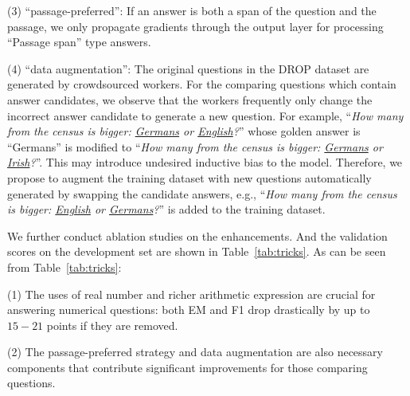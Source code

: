 \documentclass[11pt,a4paper]{article}
\begin{document}
(3) ``passage-preferred'': If an answer is both a span of the question and the passage, we only propagate gradients through the output layer for processing ``Passage span'' type answers.

(4) ``data augmentation'': The original questions in the DROP dataset are generated by crowdsourced workers. For the comparing questions which contain answer candidates, we observe that the workers frequently only change the incorrect answer candidate to generate a new question. For example, ``\emph{How many from the census is bigger: \underline{Germans} or \underline{English}?}'' whose golden answer is ``Germans'' is modified to ``\emph{How many from the census is bigger: \underline{Germans} or \underline{Irish}?}''. This may introduce undesired inductive bias to the model. Therefore, we propose to augment the training dataset with new questions automatically generated by swapping the candidate answers, e.g., ``\emph{How many from the census is bigger: \underline{English} or \underline{Germans}?}'' is added to the training dataset.

We further conduct ablation studies on the enhancements. And the validation scores on the development set are shown in Table~\ref{tab:tricks}.
As can be seen from Table~\ref{tab:tricks}:

(1) The uses of real number and richer arithmetic expression are crucial for answering numerical questions: both EM and F1 drop drastically by up to $15-21$ points if they are removed. 

(2) The passage-preferred strategy and data augmentation are also necessary components that contribute significant improvements for those comparing questions.
\end{document}

